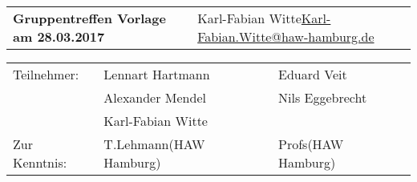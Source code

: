 \documentclass[
   draft=false
  ,paper=a4
  ,twoside=false
  ,fontsize=11pt
  ,headsepline
  ,DIV11
  ,parskip=full+
]{scrartcl} %
\begin{document}
\def\titel{Gruppentreffen Vorlage am 28.03.2017}

\def\myName{Karl-Fabian Witte}
\def\myEmail{Karl-Fabian.Witte@haw-hamburg.de}


\def\teilnehmer{ 
	& Lennart Hartmann & Eduard Veit \\
	& Alexander Mendel   & Nils Eggebrecht\\
    & Karl-Fabian Witte   & \\
}

\def\zurKenntnis {
	& T.Lehmann(HAW Hamburg) & Profs(HAW Hamburg) \\
}



\newlength{\txtw} %
\setlength{\txtw}{\textwidth} %
\addtolength{\txtw}{-10\tabcolsep} %

\def\me{\myName \newline \footnotesize{\url{\myEmail} } }

\def\tablehead{
	\hline 
	\rowcolor{tabgrey}
	\textbf{Nr.} & 
	\textbf{Art} & 
	\textbf{Stichwort und Beschreibung} & 
	\textbf{Wer} & 
	\textbf{Bis wann} \\
	\hline 
	\endhead}
\begin{tabular}{p{0.65\txtw} p{0.35\txtw}}
	\textbf{\Large{\titel}} & \me  \\
\end{tabular}

\begin{tabular}{l p{0.4\txtw} p{0.4\txtw} }
	Teilnehmer: \teilnehmer
	Zur Kenntnis: \zurKenntnis
\end{tabular}
\end{document}

